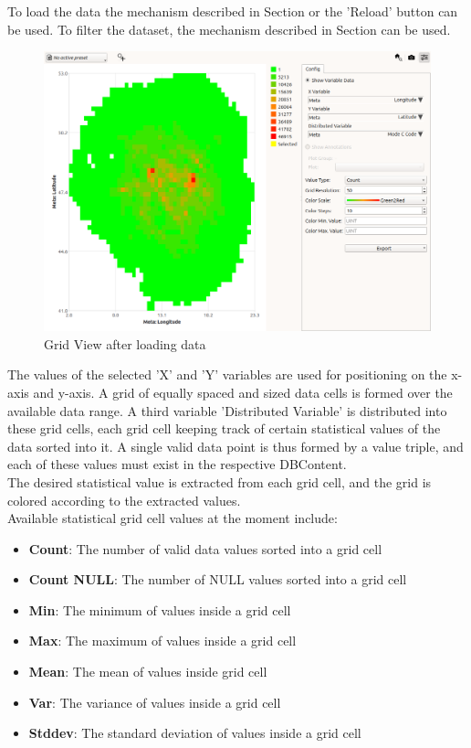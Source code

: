 To load the data the mechanism described in Section  or the 'Reload' button can be used. To filter the dataset, the mechanism described in Section  can be used. \\

\begin{figure}[H]
    \hspace*{-2cm}
    \includegraphics[width=18cm,frame]{figures/grid_loaded.png}
  \caption{Grid View after loading data}
\end{figure}

The values of the selected 'X' and 'Y' variables are used for positioning on the x-axis and y-axis.
A grid of equally spaced and sized data cells is formed over the available data range.
A third variable 'Distributed Variable' is distributed into these grid cells, each grid cell
keeping track of certain statistical values of the data sorted into it.
A single valid data point is thus formed by a value triple, and each of these values must exist in the respective DBContent. \\

The desired statistical value is extracted from each grid cell, and the grid is colored according to the extracted values. \\

Available statistical grid cell values at the moment include:

\begin{itemize}
    \item \textbf{Count}: The number of valid data values sorted into a grid cell
    \item \textbf{Count NULL}: The number of NULL values sorted into a grid cell
    \item \textbf{Min}: The minimum of values inside a grid cell
    \item \textbf{Max}: The maximum of values inside a grid cell
    \item \textbf{Mean}: The mean of values inside grid cell
    \item \textbf{Var}: The variance of values inside a grid cell
    \item \textbf{Stddev}: The standard deviation of values inside a grid cell
\end{itemize}
\ \\

